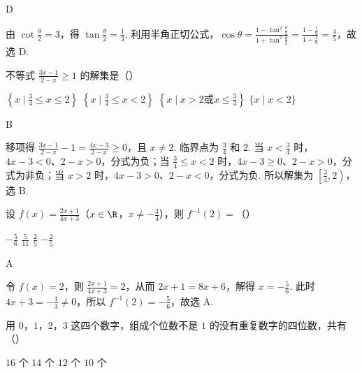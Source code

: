 \documentclass[UTF8,a4paper,oneside,11pt]{ctexbook}
\begin{document}
\begin{answer}D\end{answer}

\begin{solution}
由 \(\cot\frac\theta2=3\)，得 \(\tan\frac\theta2=\frac13\). 利用半角正切公式，\(\cos\theta=\frac{1-\tan^{2}\frac\theta2}{1+\tan^{2}\frac\theta2}=\frac{1-\frac19}{1+\frac19}=\frac45\)，故选 D.
\end{solution}

\begin{problem}
不等式 \(\displaystyle\frac{3x-1}{2-x}\geqslant1\) 的解集是（\quad）

\choices
{\(\left\{x\mid\frac34\leqslant x\leqslant2\right\}\)}
{\(\left\{x\mid\frac34\leqslant x<2\right\}\)}
{\(\left\{x\mid x>2\text{或}x\leqslant\frac34\right\}\)}
{\(\{x\mid x<2\}\)}
\end{problem}

\begin{answer}B\end{answer}

\begin{solution}
移项得 \(\frac{3x-1}{2-x}-1=\frac{4x-3}{2-x}\geqslant0\)，且 \(x\neq2\). 临界点为 \(\frac34\) 和 \(2\). 当 \(x<\frac34\) 时，\(4x-3<0\)、\(2-x>0\)，分式为负；当 \(\frac34\leqslant x<2\) 时，\(4x-3\geqslant0\)、\(2-x>0\)，分式为非负；当 \(x>2\) 时，\(4x-3>0\)、\(2-x<0\)，分式为负. 所以解集为 \(\left[\frac34,2\right)\)，选 B.
\end{solution}

\begin{problem}
设 \(f(x)=\frac{2x+1}{4x+3}\)（\(x\in\R\)，\(x\neq-\frac34\)），则 \(f^{-1}(2)=\)（\quad）

\choices
{\(-\frac56\)}
{\(\frac5{11}\)}
{\(\frac25\)}
{\(-\frac25\)}
\end{problem}

\begin{answer}A\end{answer}

\begin{solution}
令 \(f(x)=2\)，则 \(\frac{2x+1}{4x+3}=2\)，从而 \(2x+1=8x+6\)，解得 \(x=-\frac56\). 此时 \(4x+3=-\frac13\neq0\)，所以 \(f^{-1}(2)=-\frac56\)，故选 A.
\end{solution}

\begin{problem}
用 \(0\)，\(1\)，\(2\)，\(3\) 这四个数字，组成个位数不是 \(1\) 的没有重复数字的四位数，共有（\quad）

\choices
{\(16\) 个}
{\(14\) 个}
{\(12\) 个}
{\(10\) 个}
\end{problem}
\end{document}
